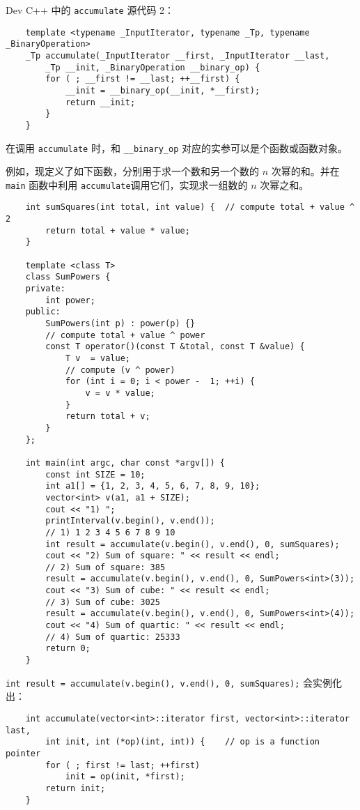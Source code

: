 \documentclass[UTF8]{ctexart}
\begin{document}
Dev C++ 中的 \texttt{accumulate} 源代码 2：
\begin{verbatim}
    template <typename _InputIterator, typename _Tp, typename _BinaryOperation>
    _Tp accumulate(_InputIterator __first, _InputIterator __last,
        _Tp __init, _BinaryOperation __binary_op) {
        for ( ; __first != __last; ++__first) {
            __init = __binary_op(__init, *__first);
            return __init;
        }
    }
\end{verbatim}
在调用 \texttt{accumulate} 时，和 \texttt{\_\_binary\_op} 对应的实参可以是个函数或函数对象。

例如，现定义了如下函数，分别用于求一个数和另一个数的 $n$ 次幂的和。并在 \texttt{main} 函数中利用
\texttt{accumulate}调用它们，实现求一组数的 $n$ 次幂之和。
\begin{verbatim}
    int sumSquares(int total, int value) {  // compute total + value ^ 2
        return total + value * value;
    }

    template <class T>
    class SumPowers {
    private:
        int power;
    public:
        SumPowers(int p) : power(p) {}
        // compute total + value ^ power
        const T operator()(const T &total, const T &value) {
            T v  = value;
            // compute (v ^ power)
            for (int i = 0; i < power -  1; ++i) {
                v = v * value;
            }
            return total + v;
        }
    };

    int main(int argc, char const *argv[]) {
        const int SIZE = 10;
        int a1[] = {1, 2, 3, 4, 5, 6, 7, 8, 9, 10};
        vector<int> v(a1, a1 + SIZE);
        cout << "1) ";
        printInterval(v.begin(), v.end());
        // 1) 1 2 3 4 5 6 7 8 9 10
        int result = accumulate(v.begin(), v.end(), 0, sumSquares);
        cout << "2) Sum of square: " << result << endl;
        // 2) Sum of square: 385
        result = accumulate(v.begin(), v.end(), 0, SumPowers<int>(3));
        cout << "3) Sum of cube: " << result << endl;
        // 3) Sum of cube: 3025
        result = accumulate(v.begin(), v.end(), 0, SumPowers<int>(4));
        cout << "4) Sum of quartic: " << result << endl;
        // 4) Sum of quartic: 25333
        return 0;
    }
\end{verbatim}

\texttt{int result = accumulate(v.begin(), v.end(), 0, sumSquares);} 会实例化出：
\begin{verbatim}
    int accumulate(vector<int>::iterator first, vector<int>::iterator last,
        int init, int (*op)(int, int)) {    // op is a function pointer
        for ( ; first != last; ++first)
            init = op(init, *first);
        return init;
    }
\end{verbatim}
\end{document}

